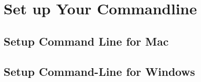 \chapter{Set up Your Commandline}\label{ch:setup-your-commandline}


\section{Setup Command Line for Mac}\label{sec:setup-command-line-for-mac}

\section{Setup Command-Line for Windows}\label{sec:setup-command-line-for-windows}
